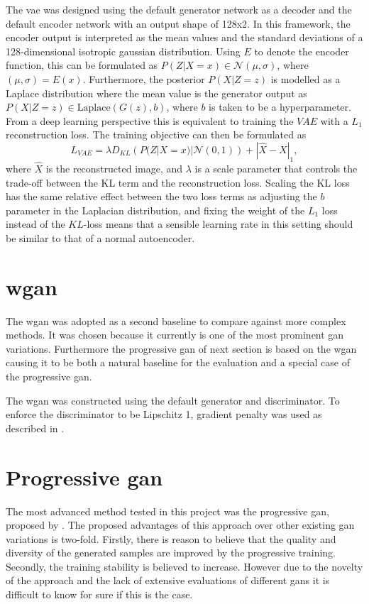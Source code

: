 The \acrlong{vae} was designed using the default generator network as a decoder and the default encoder network with an output shape of 128x2. In this framework, the encoder output is interpreted as the mean values and the standard deviations of a 128-dimensional isotropic gaussian distribution. Using $E$ to denote the encoder function, this can be formulated as $P(Z|X=x) \in \mathcal{N}(\mu, \sigma)$, where $(\mu, \sigma) = E(x)$. Furthermore, the posterior $P(X|Z=z)$ is modelled as a Laplace distribution where the mean value is the generator output as $P(X|Z=z) \in \text{Laplace}(G(z), b)$, where $b$ is taken to be a hyperparameter. From a deep learning perspective this is equivalent to training the $VAE$ with a $L_1$ reconstruction loss. The training objective can then be formulated as 
\begin{equation}
    L_{VAE} = \lambda D_{KL}\left(P(Z|X=x) | \mathcal{N}(0,1)\right) + |\hat{X} - X|_1,
\end{equation}
where $\hat{X}$ is the reconstructed image, and $\lambda$ is a scale parameter that controls the trade-off between the KL term and the reconstruction loss. Scaling the KL loss has the same relative effect between the two loss terms as adjusting the $b$ parameter in the Laplacian distribution, and fixing the weight of the $L_1$ loss instead of the $KL$-loss means that a sensible learning rate in this setting should be similar to that of a normal autoencoder. 

\section{\acrlong{wgan}}
The \acrfull{wgan} was adopted as a second baseline to compare against more complex methods. It was chosen because it currently is one of the most prominent \acrshort{gan} variations. Furthermore the progressive \acrshort{gan} of next section is based on the \acrshort{wgan} causing it to be both a natural baseline for the evaluation and a special case of the progressive \acrshort{gan}. 

The \acrshort{wgan} was constructed using the default generator and discriminator. To enforce the discriminator to be Lipschitz 1, gradient penalty was used as described in \parencite{gulrajani2017improved}.

\section{Progressive \acrshort{gan}}
The most advanced method tested in this project was the progressive \acrshort{gan}, proposed by \textcite{karras2017progressive}. The proposed advantages of this approach over other existing \acrshort{gan} variations is two-fold. Firstly, there is reason to believe that the quality and diversity of the generated samples are improved by the progressive training. Secondly, the training stability is believed to increase. However due to the novelty of the approach and the lack of extensive evaluations of different \acrshort{gans} \todoproofread{,} it is difficult to know for sure if this is the case.

